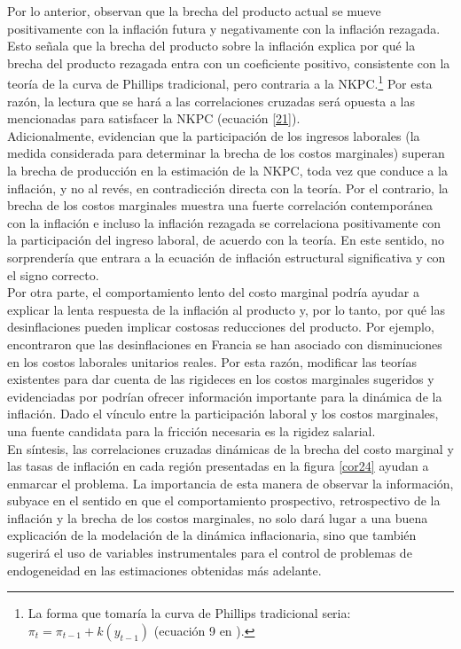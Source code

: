 Por lo anterior, \cite{gali1999inflation}  observan que  la brecha del producto actual se mueve positivamente con la inflación futura y negativamente con la inflación rezagada. Esto señala que la brecha del producto sobre la inflación explica por qué la brecha del producto rezagada entra con un coeficiente positivo, consistente con la teoría de la curva de Phillips tradicional, pero contraria a la NKPC.\footnote{La forma que tomaría la curva de Phillips tradicional seria: $\pi_{t}=\pi_{t-1}+k(y_{t-1})$ (ecuación 9 en \cite{gali1999inflation}).} Por esta razón, la lectura que se hará a las correlaciones cruzadas será opuesta a las mencionadas para satisfacer la NKPC (ecuación \eqref{21}).\\

Adicionalmente, \cite{gali1999inflation} evidencian que la participación de los ingresos laborales (la medida considerada para determinar la brecha de los costos marginales) superan la brecha de producción en la estimación de la NKPC, toda vez que conduce a la inflación, y no al revés, en contradicción directa con la teoría. Por el contrario, la brecha de los costos marginales muestra una fuerte correlación  contemporánea con la inflación e incluso la inflación rezagada se correlaciona positivamente con la participación del ingreso laboral, de acuerdo con la teoría. En este sentido, no sorprendería que entrara a la ecuación de inflación estructural significativa y con el signo correcto. \\

Por otra parte, el comportamiento lento del costo marginal podría ayudar a explicar la lenta respuesta de la inflación al producto y, por lo tanto, por qué las desinflaciones pueden implicar costosas reducciones del producto. Por ejemplo, \cite{blanchard1993competitiveness} encontraron que las desinflaciones en Francia se han asociado con disminuciones en los costos laborales unitarios reales.  Por esta razón, modificar las teorías existentes para dar cuenta de las rigideces en los costos marginales sugeridos y evidenciadas por  \cite{gali1999inflation}  podrían ofrecer información importante para la dinámica de la inflación. Dado el vínculo entre la participación laboral y los costos marginales, una fuente candidata para la fricción necesaria es la rigidez salarial.\\

En síntesis, las correlaciones cruzadas dinámicas de la brecha del costo marginal y las tasas de inflación en cada región presentadas en la figura \ref{cor24} ayudan a enmarcar el problema. La importancia de esta manera de observar la información, subyace en el sentido en que el comportamiento prospectivo, retrospectivo de la inflación y la brecha de los costos marginales, no solo dará lugar a una buena explicación de la modelación de la dinámica inflacionaria, sino que también   sugerirá el uso de variables instrumentales para el control de problemas de endogeneidad en las estimaciones obtenidas más adelante. \\

